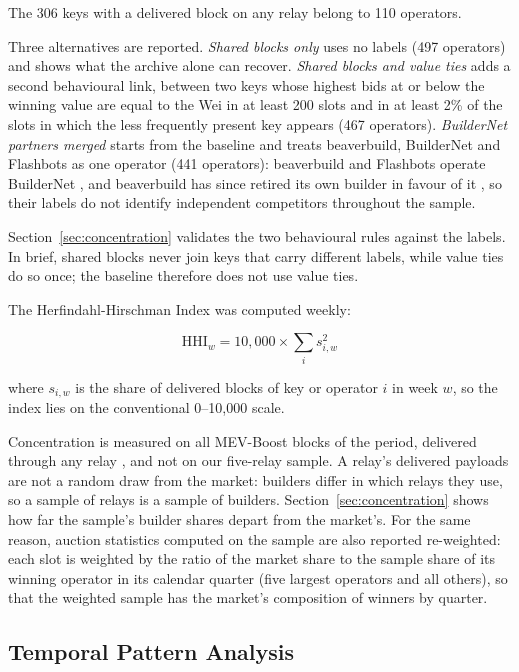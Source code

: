 \documentclass[11pt]{article}
\begin{document}
The 306 keys with a delivered block on any relay belong to 110 operators.

Three alternatives are reported. \emph{Shared blocks only} uses no labels
(497 operators) and shows what the archive alone can recover. \emph{Shared
blocks and value ties} adds a second behavioural link, between two keys
whose highest bids at or below the winning value are equal to the Wei in at
least 200 slots and in at least 2\% of the slots in which the less
frequently present key appears (467 operators). \emph{BuilderNet partners
merged} starts from the baseline and treats beaverbuild, BuilderNet and
Flashbots as one operator (441 operators): beaverbuild and Flashbots operate
BuilderNet \citep{buildernet2024}, and beaverbuild has since retired its own
builder in favour of it \citep{beaverbuild2025}, so their labels do not
identify independent competitors throughout the sample.

Section~\ref{sec:concentration} validates the two behavioural rules against
the labels. In brief, shared blocks never join keys that carry different
labels, while value ties do so once; the baseline therefore does not use
value ties.

The Herfindahl-Hirschman Index was computed weekly:

\begin{equation}
\text{HHI}_w = 10{,}000 \times \sum_i s_{i,w}^2
\label{eq:hhi}
\end{equation}

where $s_{i,w}$ is the share of delivered blocks of key or operator $i$ in
week $w$, so the index lies on the conventional 0--10,000 scale.

Concentration is measured on all MEV-Boost blocks of the period, delivered
through any relay \citep{dataalways2024}, and not on our five-relay sample.
A relay's delivered payloads are not a random draw from the market: builders
differ in which relays they use, so a sample of relays is a sample of
builders. Section~\ref{sec:concentration} shows how far the sample's builder
shares depart from the market's. For the same reason, auction statistics
computed on the sample are also reported re-weighted: each slot is weighted
by the ratio of the market share to the sample share of its winning operator
in its calendar quarter (five largest operators and all others), so that the
weighted sample has the market's composition of winners by quarter.

\subsection{Temporal Pattern Analysis}
\end{document}
